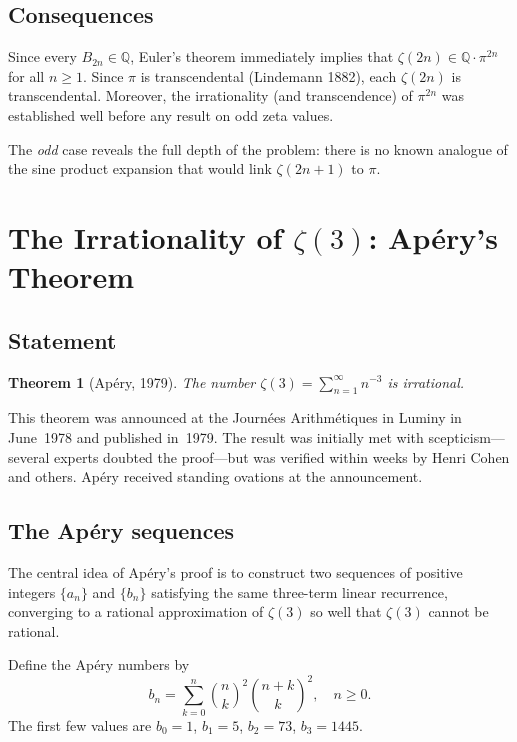 \documentclass[12pt,a4paper]{amsart}
\newtheorem{theorem}{Theorem}[section]
\theoremstyle{definition}
\theoremstyle{remark}
\begin{document}
\subsection{Consequences}

Since every $B_{2n} \in \mathbb{Q}$, Euler's theorem immediately implies that
$\zeta(2n) \in \mathbb{Q} \cdot \pi^{2n}$ for all $n \geq 1$. Since $\pi$ is
transcendental (Lindemann 1882), each $\zeta(2n)$ is transcendental. Moreover,
the irrationality (and transcendence) of $\pi^{2n}$ was established well before
any result on odd zeta values.

The \emph{odd} case reveals the full depth of the problem: there is no known
analogue of the sine product expansion that would link $\zeta(2n+1)$ to $\pi$.

\section{The Irrationality of $\zeta(3)$: Apéry's Theorem}

\subsection{Statement}

\begin{theorem}[Apéry, 1979]
  The number $\zeta(3) = \sum_{n=1}^{\infty} n^{-3}$ is irrational.
\end{theorem}

This theorem was announced at the Journées Arithmétiques in Luminy in June~1978
and published in~1979. The result was initially met with scepticism---several
experts doubted the proof---but was verified within weeks by Henri Cohen and
others. Apéry received standing ovations at the announcement.

\subsection{The Apéry sequences}

The central idea of Apéry's proof is to construct two sequences of positive
integers $\{a_n\}$ and $\{b_n\}$ satisfying the same three-term linear recurrence,
converging to a rational approximation of $\zeta(3)$ so well that $\zeta(3)$
cannot be rational.

Define the Apéry numbers by
\[
  b_n = \sum_{k=0}^{n} \binom{n}{k}^2 \binom{n+k}{k}^2, \quad n \geq 0.
\]
The first few values are $b_0 = 1$, $b_1 = 5$, $b_2 = 73$, $b_3 = 1445$.
\end{document}

